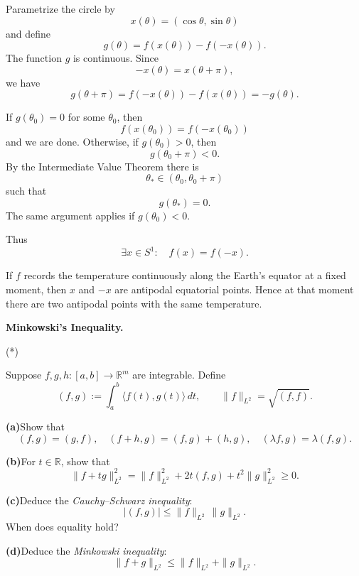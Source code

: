 \begin{solution}
Parametrize the circle by
\[
x(\theta)=(\cos\theta,\sin\theta)
\]
and define
\[
g(\theta)
=
f(x(\theta))-f(-x(\theta)).
\]
The function \(g\) is continuous. Since
\[
-x(\theta)=x(\theta+\pi),
\]
we have
\[
g(\theta+\pi)
=
f(-x(\theta))-f(x(\theta))
=
-g(\theta).
\]

If \(g(\theta_0)=0\) for some \(\theta_0\), then
\[
f(x(\theta_0))
=
f(-x(\theta_0))
\]
and we are done. Otherwise, if \(g(\theta_0)>0\), then
\[
g(\theta_0+\pi)<0.
\]
By the Intermediate Value Theorem there is
\[
\theta_*\in(\theta_0,\theta_0+\pi)
\]
such that
\[
g(\theta_*)=0.
\]
The same argument applies if \(g(\theta_0)<0\).

Thus
\[
\boxed{
\exists x\in S^1:
\quad
f(x)=f(-x).
}
\]

If \(f\) records the temperature continuously along the Earth's equator at a fixed moment,
then \(x\) and \(-x\) are antipodal equatorial points. Hence at that moment there are two
antipodal points with the same temperature.
\end{solution}


\begin{problem}[CP-II-0502]
\label{prob:cp-ii-0502}
\textbf{Minkowski's Inequality.}

\hspace*{1.5em}(*)

Suppose $f,g,h:[a,b]\to\mathbb{R}^m$ are integrable. Define
\[
(f,g) := \int_a^b \langle f(t),g(t)\rangle \, dt,
\qquad
\|f\|_{L^2} = \sqrt{(f,f)}.
\]

	\par\smallskip\noindent\textbf{(a)}\quad Show that
	\[
	(f,g)=(g,f), \quad (f+h,g)=(f,g)+(h,g), \quad (\lambda f,g)=\lambda(f,g).
	\]

	\par\smallskip\noindent\textbf{(b)}\quad For $t\in\mathbb{R}$, show that
	\[
	\|f+tg\|_{L^2}^2 = \|f\|_{L^2}^2 + 2t(f,g) + t^2\|g\|_{L^2}^2 \geq 0.
	\]

	\par\smallskip\noindent\textbf{(c)}\quad Deduce the \emph{Cauchy--Schwarz inequality}:
	\[
	|(f,g)| \leq \|f\|_{L^2}\,\|g\|_{L^2}.
	\]
	When does equality hold?

	\par\smallskip\noindent\textbf{(d)}\quad Deduce the \emph{Minkowski inequality}:
	\[
	\|f+g\|_{L^2} \leq \|f\|_{L^2}+\|g\|_{L^2}.
	\]
\end{problem}

